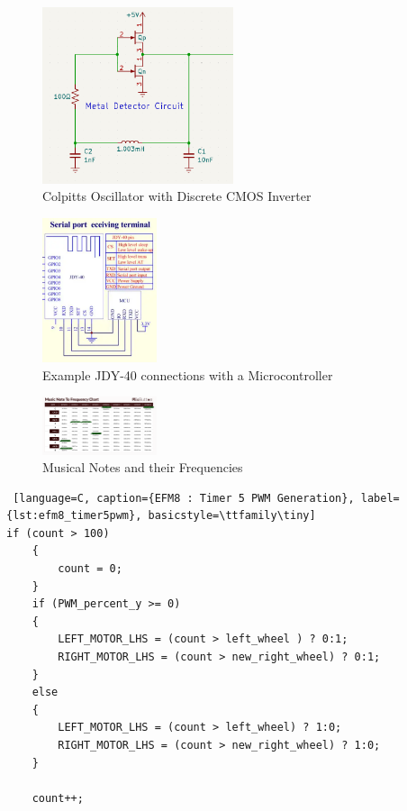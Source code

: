 \documentclass{article}
\begin{document}
\begin{figure}[htbp]
    \centering
    \includegraphics[width=0.5\textwidth]{Figures/metaldetector.png}
    \caption{Colpitts Oscillator with Discrete CMOS Inverter}
    \label{fig:metaldetector}
\end{figure}

\begin{figure}[htbp]
    \centering
    \includegraphics[width=0.3\textwidth]{Figures/jdy40.png}
    \caption{Example JDY-40 connections with a Microcontroller}
    \label{fig:JDY-40}
\end{figure}

\begin{figure}[htbp]
    \centering
    \includegraphics[width=0.3\textwidth]{Figures/Music_Frequencies.png}
    \caption{Musical Notes and their Frequencies}
    \label{fig:music_frequencies}
\end{figure}

\begin{lstlisting} [language=C, caption={EFM8 : Timer 5 PWM Generation}, label={lst:efm8_timer5pwm}, basicstyle=\ttfamily\tiny]
if (count > 100)
    {
        count = 0;
    }
    if (PWM_percent_y >= 0)
    {
        LEFT_MOTOR_LHS = (count > left_wheel ) ? 0:1;
        RIGHT_MOTOR_LHS = (count > new_right_wheel) ? 0:1;
    }
    else
    {
        LEFT_MOTOR_LHS = (count > left_wheel) ? 1:0;
        RIGHT_MOTOR_LHS = (count > new_right_wheel) ? 1:0;
    }

    count++;
\end{lstlisting}
\end{document}
